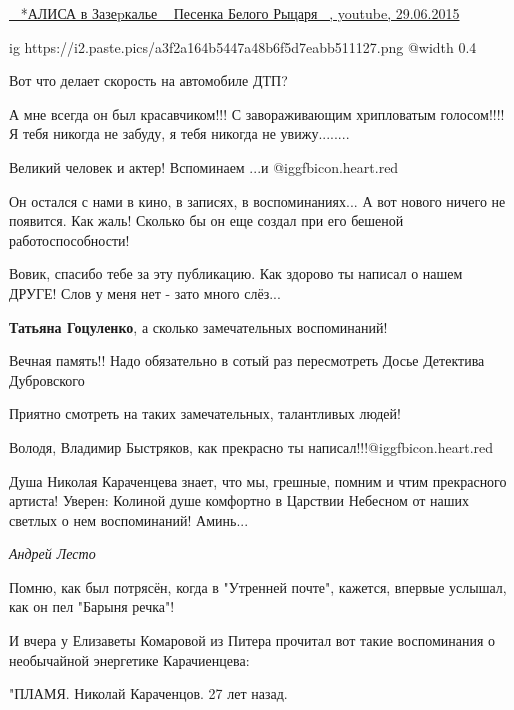 \begin{itemize}

\href{https://www.youtube.com/watch?v=5JGye1VLH4Q}{%
~ *АЛИСА в Зазеpкалье ~ Песенка Белого Рыцаря ~, youtube, 29.06.2015%
}

\ifcmt
  ig https://i2.paste.pics/a3f2a164b5447a48b6f5d7eabb511127.png
  @width 0.4
\fi

Вот что делает скорость на автомобиле ДТП?

А мне всегда он был красавчиком!!! С завораживающим хрипловатым голосом!!!! Я тебя никогда не забуду, я тебя никогда не увижу........

Великий человек и актер!
Вспоминаем ...и @igg{fbicon.heart.red}


Он остался с нами в кино, в записях, в воспоминаниях... А вот нового ничего не
появится. Как жаль! Сколько бы он еще создал при его бешеной работоспособности!


Вовик, спасибо тебе за эту публикацию. Как здорово ты написал о нашем ДРУГЕ!
Слов у меня нет - зато много слёз...

\textbf{Татьяна Гоцуленко}, а сколько замечательных воспоминаний!

Вечная память!! Надо обязательно в сотый раз пересмотреть Досье Детектива Дубровского

Приятно смотреть на таких замечательных, талантливых людей!

Володя, Владимир Быстряков, как прекрасно ты написал!!!@igg{fbicon.heart.red}


Душа Николая Караченцева знает, что мы, грешные, помним и чтим прекрасного
артиста! Уверен: Колиной душе комфортно в Царствии Небесном от наших светлых о
нем воспоминаний! Аминь...

\emph{Андрей Лесто}

Помню, как был потрясён, когда в "Утренней почте", кажется, впервые услышал, как он пел "Барыня речка"!

И вчера у Елизаветы Комаровой из Питера прочитал вот такие воспоминания о необычайной энергетике Карачиенцева:

"ПЛАМЯ. Николай Караченцов. 27 лет назад.


\end{itemize}
